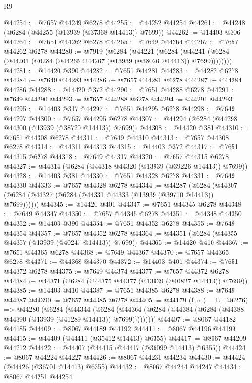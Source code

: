 \begin{lexlean}{R9}
\begin{coremodule}
@44254 := @7657 @44249 @6278
@44255 := @44252 @44254
@44261 := @44248 (@6284 (@44255 (@13939 (@37368 @14413)) @7699))
@44262 := @14403 @306
@44264 := @7651 @44262 @6278
@44265 := @7649 @44264
@44267 := @7657 @44262 @6278
@44280 := @7919
    (@6284
      (@44221
        (@6284 (@44241 (@6284 (@44261 (@6284 (@44265 @44267 (@13939 (@38026 @14413)) @7699))))))))
@44281 := @14420 @390
@44282 := @7651 @44281
@44283 := @44282 @6278
@44284 := @7649 @44283
@44286 := @7657 @44281 @6278
@44287 := @44284 @44286
@44288 := @14420 @372
@44290 := @7651 @44288 @6278
@44291 := @7649 @44290
@44293 := @7657 @44288 @6278
@44294 := @44291 @44293
@44295 := @14403 @317
@44297 := @7651 @44295 @6278
@44298 := @7649 @44297
@44300 := @7657 @44295 @6278
@44307 := @44294 (@6284 (@44298 @44300 (@13939 (@38720 @14413)) @7699))
@44308 := @14420 @381
@44310 := @7651 @44308 @6278
@44311 := @7649 @44310
@44313 := @7657 @44308 @6278
@44314 := @44311 @44313
@44315 := @14403 @372
@44317 := @7651 @44315 @6278
@44318 := @7649 @44317
@44320 := @7657 @44315 @6278
@44327 := @44314 (@6284 (@44318 @44320 (@13939 (@39226 @14413)) @7699))
@44328 := @14403 @381
@44330 := @7651 @44328 @6278
@44331 := @7649 @44330
@44333 := @7657 @44328 @6278
@44344 := @44287
    (@6284 (@44307 (@6284 (@44327 (@6284 (@44331 @44333 (@13939 (@39710 @14413)) @7699))))))
@44345 := @14420 @401
@44347 := @7651 @44345 @6278
@44348 := @7649 @44347
@44350 := @7657 @44345 @6278
@44351 := @44348 @44350
@44352 := @14403 @390
@44354 := @7651 @44352 @6278
@44355 := @7649 @44354
@44357 := @7657 @44352 @6278
@44364 := @44351 (@6284 (@44355 @44357 (@13939 (@40247 @14413)) @7699))
@44365 := @14420 @410
@44367 := @7651 @44365 @6278
@44368 := @7649 @44367
@44370 := @7657 @44365 @6278
@44371 := @44368 @44370
@44372 := @14403 @401
@44374 := @7651 @44372 @6278
@44375 := @7649 @44374
@44377 := @7657 @44372 @6278
@44384 := @44371 (@6284 (@44375 @44377 (@13939 (@40827 @14413)) @7699))
@44385 := @14403 @410
@44387 := @7651 @44385 @6278
@44388 := @7649 @44387
@44390 := @7657 @44385 @6278
@44405 := @44179
    (fun (__b : @6276) =>
    @44280
      (@6284
        (@44344
          (@6284
            (@44364 (@6284 (@44384 (@6284 (@44388 @44390 (@13939 (@41289 @14413)) @7699)))))))))
@44407 := @8067 @44182 @44185
@44409 := @8067 @44189 @44192
@44411 := @8067 @44196 @44199
@44415 := @44409 (@44411 (@35412 @14413) @6355)
@44417 := @8067 @44209 @44212
@44422 := @44407 (@44415 (@44417 (@36099 @14413) @6355))
@44424 := @8067 @44224 @44227
@44426 := @8067 @44231 @44234
@44430 := @44424 (@44426 (@36701 @14413) @6355)
@44432 := @8067 @44244 @44247
@44434 := @8067 @44251 @44254

\end{coremodule}
\end{lexlean}
